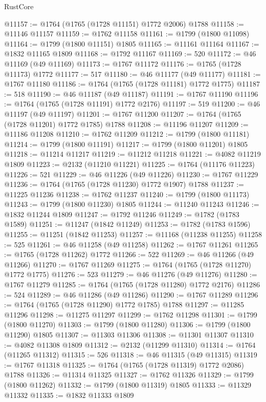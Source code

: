 \begin{lexlean}{RustCore}
\begin{coremodule}
@11157 := @1764 (@1765 (@1728 @11151) @1772 @2006) @1788
@11158 := @11146 @11157
@11159 := @1762 @11158
@11161 := @1799 (@1800 @11098)
@11164 := @1799 (@1800 @11151) @1805
@11165 := @11161 @11164
@11167 := @1832 @11165 @1809
@11168 := @1792 @11167
@11169 := 520
@11172 := @46 @11169 (@49 @11169)
@11173 := @1767 @11172
@11176 := @1765 (@1728 @11173) @1772
@11177 := 517
@11180 := @46 @11177 (@49 @11177)
@11181 := @1767 @11180
@11186 := @1764 (@1765 (@1728 @11181) @1772 @1775)
@11187 := 518
@11190 := @46 @11187 (@49 @11187)
@11191 := @1767 @11190
@11196 := @1764 (@1765 (@1728 @11191) @1772 @2176)
@11197 := 519
@11200 := @46 @11197 (@49 @11197)
@11201 := @1767 @11200
@11207 := @1764 (@1765 (@1728 @11201) @1772 @1785) @1788
@11208 := @11196 @11207
@11209 := @11186 @11208
@11210 := @1762 @11209
@11212 := @1799 (@1800 @11181)
@11214 := @1799 (@1800 @11191)
@11217 := @1799 (@1800 @11201) @1805
@11218 := @11214 @11217
@11219 := @11212 @11218
@11221 := @4082 @11219 @1809
@11223 := @2132 (@11210 @11221)
@11225 := @1764 (@11176 @11223)
@11226 := 521
@11229 := @46 @11226 (@49 @11226)
@11230 := @1767 @11229
@11236 := @1764 (@1765 (@1728 @11230) @1772 @1907) @1788
@11237 := @11225 @11236
@11238 := @1762 @11237
@11240 := @1799 (@1800 @11173)
@11243 := @1799 (@1800 @11230) @1805
@11244 := @11240 @11243
@11246 := @1832 @11244 @1809
@11247 := @1792 @11246
@11249 := @1782 (@1783 @1589)
@11251 := @11247 (@1842 @11249)
@11253 := @1782 (@1783 @1596)
@11255 := @11251 (@1842 @11253)
@11257 := @11168 (@11238 @11255)
@11258 := 525
@11261 := @46 @11258 (@49 @11258)
@11262 := @1767 @11261
@11265 := @1765 (@1728 @11262) @1772
@11266 := 522
@11269 := @46 @11266 (@49 @11266)
@11270 := @1767 @11269
@11275 := @1764 (@1765 (@1728 @11270) @1772 @1775)
@11276 := 523
@11279 := @46 @11276 (@49 @11276)
@11280 := @1767 @11279
@11285 := @1764 (@1765 (@1728 @11280) @1772 @2176)
@11286 := 524
@11289 := @46 @11286 (@49 @11286)
@11290 := @1767 @11289
@11296 := @1764 (@1765 (@1728 @11290) @1772 @1785) @1788
@11297 := @11285 @11296
@11298 := @11275 @11297
@11299 := @1762 @11298
@11301 := @1799 (@1800 @11270)
@11303 := @1799 (@1800 @11280)
@11306 := @1799 (@1800 @11290) @1805
@11307 := @11303 @11306
@11308 := @11301 @11307
@11310 := @4082 @11308 @1809
@11312 := @2132 (@11299 @11310)
@11314 := @1764 (@11265 @11312)
@11315 := 526
@11318 := @46 @11315 (@49 @11315)
@11319 := @1767 @11318
@11325 := @1764 (@1765 (@1728 @11319) @1772 @2086) @1788
@11326 := @11314 @11325
@11327 := @1762 @11326
@11329 := @1799 (@1800 @11262)
@11332 := @1799 (@1800 @11319) @1805
@11333 := @11329 @11332
@11335 := @1832 @11333 @1809

\end{coremodule}
\end{lexlean}
